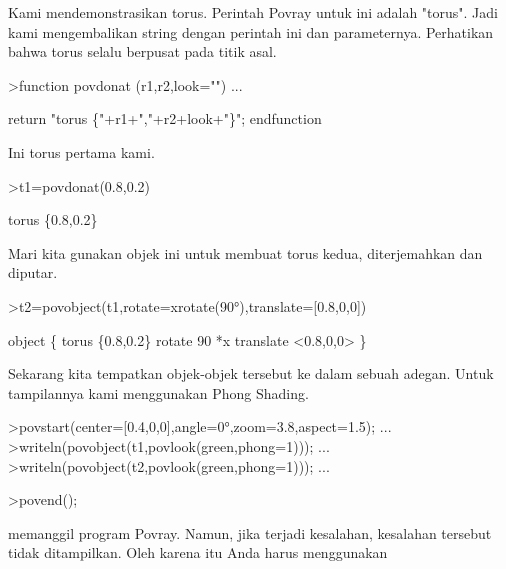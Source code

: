 \documentclass{article}
\begin{document}
\begin{eulernotebook}
\begin{eulercomment}
\begin{eulercomment}
\begin{eulercomment}
\begin{eulercomment}
\begin{eulercomment}
\begin{eulercomment}
\begin{eulercomment}
\begin{eulercomment}
\begin{eulercomment}
\begin{eulercomment}
\begin{eulercomment}
\begin{eulercomment}
\begin{eulercomment}
\begin{eulercomment}
\begin{eulercomment}
\begin{eulercomment}
\begin{eulercomment}
\begin{eulercomment}
\begin{eulercomment}
\begin{eulercomment}
\begin{eulercomment}
Kami mendemonstrasikan torus. Perintah Povray untuk ini adalah
"torus". Jadi kami mengembalikan string dengan perintah ini dan
parameternya. Perhatikan bahwa torus selalu berpusat pada titik asal.
\end{eulercomment}
\begin{eulerprompt}
>function povdonat (r1,r2,look="") ...
\end{eulerprompt}
\begin{eulerudf}
    return "torus \{"+r1+","+r2+look+"\}";
  endfunction
\end{eulerudf}
\begin{eulercomment}
Ini torus pertama kami.
\end{eulercomment}
\begin{eulerprompt}
>t1=povdonat(0.8,0.2)
\end{eulerprompt}
\begin{euleroutput}
  torus \{0.8,0.2\}
\end{euleroutput}
\begin{eulercomment}
Mari kita gunakan objek ini untuk membuat torus kedua, diterjemahkan
dan diputar.
\end{eulercomment}
\begin{eulerprompt}
>t2=povobject(t1,rotate=xrotate(90°),translate=[0.8,0,0])
\end{eulerprompt}
\begin{euleroutput}
  object \{ torus \{0.8,0.2\}
   rotate 90 *x 
   translate <0.8,0,0>
   \}
\end{euleroutput}
\begin{eulercomment}
Sekarang kita tempatkan objek-objek tersebut ke dalam sebuah adegan.
Untuk tampilannya kami menggunakan Phong Shading.
\end{eulercomment}
\begin{eulerprompt}
>povstart(center=[0.4,0,0],angle=0°,zoom=3.8,aspect=1.5); ...
>writeln(povobject(t1,povlook(green,phong=1))); ...
>writeln(povobject(t2,povlook(green,phong=1))); ...
\end{eulerprompt}
\begin{eulercomment}
\textgreater{}povend();

memanggil program Povray. Namun, jika terjadi kesalahan, kesalahan
tersebut tidak ditampilkan. Oleh karena itu Anda harus menggunakan


\end{eulercomment}
\end{eulercomment}
\end{eulercomment}
\end{eulercomment}
\end{eulercomment}
\end{eulercomment}
\end{eulercomment}
\end{eulercomment}
\end{eulercomment}
\end{eulercomment}
\end{eulercomment}
\end{eulercomment}
\end{eulercomment}
\end{eulercomment}
\end{eulercomment}
\end{eulercomment}
\end{eulercomment}
\end{eulercomment}
\end{eulercomment}
\end{eulercomment}
\end{eulercomment}
\end{eulernotebook}
\end{document}
